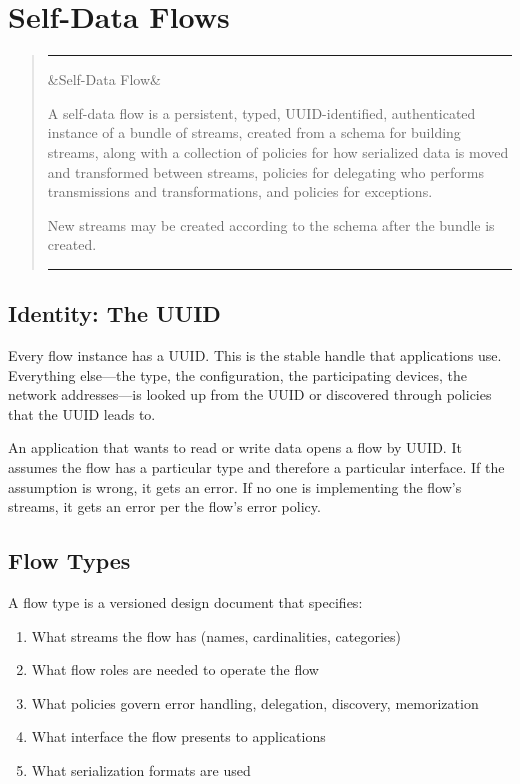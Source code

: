 \documentclass[11pt, letterpaper]{article}
\newenvironment{definition}[1][]
  {\par\medskip\begin{quote}
   \color{rimdark}\rule{\dimexpr\linewidth}{1.5pt}\par\smallskip
   \ifx&#1&\else\noindent{\bfseries #1}\par\smallskip\fi}
  {\par\smallskip\color{rimdark}\rule{\dimexpr\linewidth}{1.5pt}
   \end{quote}\medskip}
\begin{document}
\newpage
\section{Self-Data Flows}
\label{sec:flows}

\begin{definition}[Self-Data Flow]
A self-data flow is a persistent, typed, UUID-identified, authenticated instance of a
bundle of streams, created from a schema for building streams, along with a collection
of policies for how serialized data is moved and transformed between streams, policies
for delegating who performs transmissions and transformations, and policies for exceptions.

New streams may be created according to the schema after the bundle is created.
\end{definition}

\subsection{Identity: The UUID}

Every flow instance has a UUID. This is the stable handle that applications use.
Everything else---the type, the configuration, the participating devices, the network
addresses---is looked up from the UUID or discovered through policies that the UUID
leads to.

An application that wants to read or write data opens a flow by UUID. It assumes the
flow has a particular type and therefore a particular interface. If the assumption is
wrong, it gets an error. If no one is implementing the flow's streams, it gets an error
per the flow's error policy.

\subsection{Flow Types}

A flow type is a versioned design document that specifies:

\begin{enumerate}[leftmargin=2em]
  \item What streams the flow has (names, cardinalities, categories)
  \item What flow roles are needed to operate the flow
  \item What policies govern error handling, delegation, discovery, memorization
  \item What interface the flow presents to applications
  \item What serialization formats are used
\end{enumerate}
\end{document}
